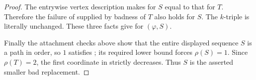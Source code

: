 \begin{proof}
The entrywise vertex description makes
 for \(S\) equal to that for \(T\).
Therefore the failure of  supplied
by badness of \(T\) also holds for \(S\).  The \(k\)-triple is literally
unchanged.  These three facts give  for
\((\varphi,S)\).

Finally the attachment checks above show that the entire displayed
sequence \(S\) is a path in order, so \(1\) satisfies
; its required lower bound forces
\(\rho(S)=1\).  Since \(\rho(T)=2\), the first coordinate in
 strictly decreases.  Thus \(S\) is the
asserted smaller bad replacement.
\end{proof}

